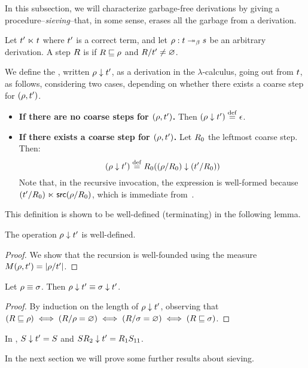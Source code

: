 
In this subsection, we will characterize garbage-free derivations by giving
a procedure--\emph{sieving}--that, in some sense, erases all the garbage from a derivation.

\begin{definition}[Sieving]
Let $t' \mathrel{\ltimes} t$ where $t'$ is a correct term,
and let $\rho : t \mathrel{\twoheadrightarrow_\beta} s$ be an arbitrary derivation.
A step $R$ is  if
$R \sqsubseteq \rho$ and $R/t' \neq \varnothing$.

We define the ,
written $\rho \downarrow t'$, as a derivation in the $\lambda$-calculus,
going out from $t$, as follows, considering two cases, depending on whether there exists a
coarse step for $(\rho,t')$.
\begin{itemize}
\item {\bf If there are no coarse steps for $(\rho,t')$.}
  Then
  $(\rho \downarrow t') \overset{\mathrm{def}}{=} \epsilon$.
\item {\bf If there exists a coarse step for $(\rho,t')$.}
  Let $R_0$ the leftmost coarse step.
  Then:
  \[
    (\rho \downarrow t') \overset{\mathrm{def}}{=} R_0 ((\rho/R_0) \downarrow (t'/R_0))
  \]
  Note that, in the recursive invocation, the expression is well-formed because
  $(t'/R_0) \mathrel{\ltimes} \mathsf{src}(\rho/R_0)$,
  which is immediate from~.
\end{itemize}
This definition is shown to be well-defined (terminating) in the following lemma.
\end{definition}

\begin{lemma}
The operation $\rho \downarrow t'$ is well-defined.
\end{lemma}
\begin{proof}
We show that the recursion is well-founded using the measure
  $M(\rho,t') = |\rho/t'|$.
\end{proof}

\begin{lemma}
Let $\rho \equiv \sigma$. Then $\rho \downarrow t' \equiv \sigma \downarrow t'$.
\end{lemma}
\begin{proof}
By induction on the length of $\rho \downarrow t'$, observing that
$(R \sqsubseteq \rho) \iff (R/\rho = \varnothing) \iff (R/\sigma = \varnothing) \iff (R \sqsubseteq \sigma)$.
\end{proof}

\begin{example}
In ,
$S \downarrow t' = S$
and
$SR_2 \downarrow t' = R_1S_{11}$.
\end{example}

In the next section we will prove some further results about sieving.
